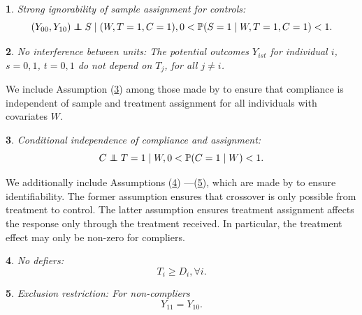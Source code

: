 \documentclass[12pt]{article}
\makeatletter
\newtheorem*{assumption*}{\assumptionnumber}
\providecommand{\assumptionnumber}{}
\newenvironment{assumption}[2]
 {%
  \renewcommand{\assumptionnumber}{Assumption #1}%
  \begin{assumption*}%
  \protected@edef\@currentlabel{#1}%
 }
 {%
  \end{assumption*}
 }
\newcommand{\pr}{\mathbb{P}} %
\newcommand\independent{\protect\mathpalette{\protect\independenT}{\perp}}
\def\independenT#1#2{\mathrel{\rlap{$#1#2$}\mkern2mu{#1#2}}}
\makeatother
\begin{document}
\begin{assumption}{3}{}\label{si_ctrl}
Strong ignorability of sample assignment for controls:
\begin{equation*}
(Y_{00}, Y_{10}) \independent S \mid (W, T=1,C = 1), 0 < \pr(S=1 \mid W, T=1,C = 1) <1. 
\end{equation*}\end{assumption}
 
\begin{assumption}{4}{}\label{sutva}
No interference between units: The potential outcomes $Y_{ist}$ for individual $i$, $s = 0,1$, $t=0,1$ do not depend on $T_j$, for all $j\neq i$. 

\end{assumption} 

We include Assumption (\ref{compl}) among those made by \cite{Hartman} to ensure that compliance is independent of sample and treatment assignment for all individuals with covariates $W$. 
 
\begin{assumption}{5}{}\label{compl}
Conditional independence of compliance and assignment:
\begin{equation*}
C \independent T=1 \mid W, 0 < \pr(C = 1 \mid W) < 1. 
\end{equation*}
\end{assumption}

We additionally include Assumptions (\ref{monotonicity}) ---(\ref{ER}), which are made by \cite{Angrist1996} to ensure identifiability. The former assumption ensures that crossover is only possible from treatment to control.  The latter assumption ensures treatment assignment affects the response only through the treatment received.  In particular, the treatment effect may only be non-zero for compliers.

\begin{assumption}{6}{}\label{monotonicity}
No defiers: 
\begin{equation*}
T_i \geq D_i, \forall i. 
\end{equation*}
\end{assumption}

\begin{assumption}{7}{}\label{ER}
Exclusion restriction: For non-compliers
\begin{equation*}
Y_{11} = Y_{10}. 
\end{equation*}  
\end{assumption}
\end{document}
